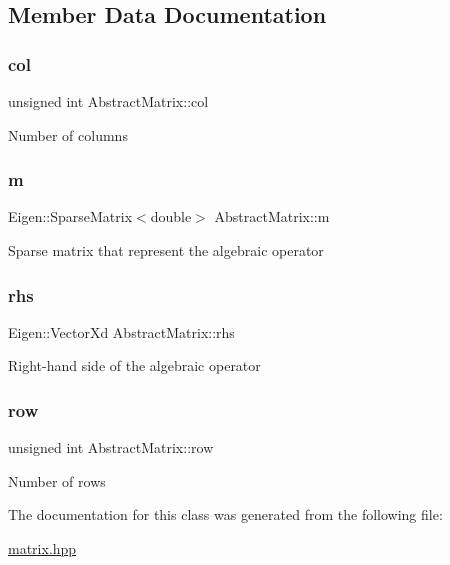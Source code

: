 \subsection{Member Data Documentation}
\mbox{\label{classAbstractMatrix_af3ad3551ce094979488cef5df0e4fc1d}} 
\subsubsection{\texorpdfstring{col}{col}}
{\footnotesize\ttfamily unsigned int Abstract\+Matrix\+::col\hspace{0.3cm}{\ttfamily [protected]}}

Number of columns \mbox{\label{classAbstractMatrix_afec41dcfd1da4b3b44b787249cc5da87}} 
\subsubsection{\texorpdfstring{m}{m}}
{\footnotesize\ttfamily Eigen\+::\+Sparse\+Matrix$<$double$>$ Abstract\+Matrix\+::m\hspace{0.3cm}{\ttfamily [protected]}}

Sparse matrix that represent the algebraic operator \mbox{\label{classAbstractMatrix_aa3665f993211fb39b9c6ee34384223c5}} 
\subsubsection{\texorpdfstring{rhs}{rhs}}
{\footnotesize\ttfamily Eigen\+::\+Vector\+Xd Abstract\+Matrix\+::rhs\hspace{0.3cm}{\ttfamily [protected]}}

Right-\/hand side of the algebraic operator \mbox{\label{classAbstractMatrix_a27fb46bf2853d4927d92a81b8b7773fb}} 
\subsubsection{\texorpdfstring{row}{row}}
{\footnotesize\ttfamily unsigned int Abstract\+Matrix\+::row\hspace{0.3cm}{\ttfamily [protected]}}

Number of rows 

The documentation for this class was generated from the following file\+:\begin{DoxyCompactItemize}
\item 
\hyperlink{matrix_8hpp}{matrix.\+hpp}\end{DoxyCompactItemize}
